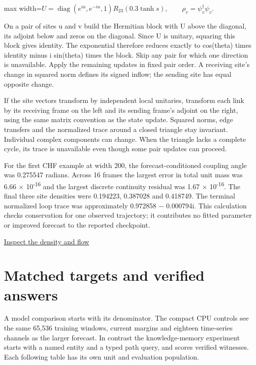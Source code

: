 \documentclass[11pt,oneside,openany]{book}
\begin{document}
\begin{center}\begin{adjustbox}{max width=\linewidth}$\displaystyle U=\operatorname{diag}(e^{ia},e^{-ia},1)R_{23}(0.3\tanh s),\qquad \rho_v=\psi_v^\dagger\psi_v.$\end{adjustbox}\end{center}
On a pair of sites u and v build the Hermitian block with U above the diagonal, its adjoint below and zeros on the diagonal. Since U is unitary, squaring this block gives identity. The exponential therefore reduces exactly to cos(theta) times identity minus i sin(theta) times the block. Skip any pair for which one direction is unavailable. Apply the remaining updates in fixed pair order. A receiving site’s change in squared norm defines its signed inflow; the sending site has equal opposite change.

If the site vectors transform by independent local unitaries, transform each link by its receiving frame on the left and its sending frame’s adjoint on the right, using the same matrix convention as the state update. Squared norms, edge transfers and the normalized trace around a closed triangle stay invariant. Individual complex components can change. When the triangle lacks a complete cycle, its trace is unavailable even though some pair updates can proceed.

For the first CHF example at width 200, the forecast-conditioned coupling angle was 0.275547 radians. Across 16 frames the largest error in total unit mass was 6.66 \ensuremath{\times} 10\textsuperscript{-}\textsuperscript{1}\textsuperscript{6} and the largest discrete continuity residual was 1.67 \ensuremath{\times} 10\textsuperscript{-}\textsuperscript{1}\textsuperscript{6}. The final three site densities were 0.194223, 0.387028 and 0.418749. The terminal normalized loop trace was approximately 0.972858 \ensuremath{-} 0.000794i. This calculation checks conservation for one observed trajectory; it contributes no fitted parameter or improved forecast to the reported checkpoint.

{\small\sffamily\href{https://amelie-iska.github.io/phaseweave-lab/density.html}{Inspect the density and flow}\par}
\chapter{Matched targets and verified answers}
A model comparison starts with its denominator. The compact CPU controls see the same 65,536 training windows, current margins and eighteen time-series channels as the larger forecast. In contrast the knowledge-memory experiment starts with a named entity and a typed path query, and scores verified witnesses. Each following table has its own unit and evaluation population.
\end{document}
